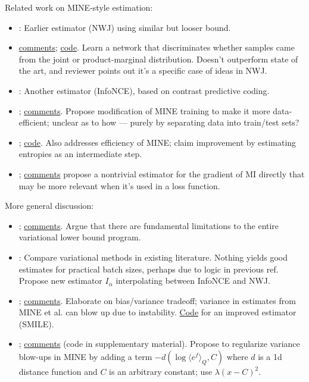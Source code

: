 \documentclass[notitlepage,openany,11pt]{report}
\theoremstyle{plain}%
\numberwithin{equation}{section}
\begin{document}
Related work on MINE-style estimation:
\begin{itemize}
\item \cite{NguyenEtAl:10}: Earlier estimator (NWJ) using similar but looser bound.
\item \cite{LiaoEtAl:20} \href{https://openreview.net/forum?id=3LujMJM9EMp}{comments}; \href{https://github.com/RayRuizhiLiao/demi_mi_estimator}{code}. Learn a network that discriminates whether samples came from the joint or product-marginal distribution. Doesn't outperform state of the art, and reviewer points out it's a specific case of ideas in NWJ.
\item \cite{OordEtAl:19}: Another estimator (InfoNCE), based on contrast predictive coding.
\item \cite{LinEtAl:19}; \href{https://openreview.net/forum?id=SklOypVKvS}{comments}. Propose modification of MINE training to make it more data-efficient; unclear as to how --- purely by separating data into train/test sets?
\item \cite{ChanEtAl:19}; \href{https://github.com/ccha23/MI-NEE}{code}. Also addresses efficiency of MINE; claim improvement by estimating entropies as an intermediate step.
\item \cite{WenEtAl:20}; \href{https://openreview.net/forum?id=ByxaUgrFvH}{comments} propose a nontrivial estimator for the gradient of MI directly that may be more relevant when it's used in a loss function.
\end{itemize}

More general discussion:
\begin{itemize}
\item \cite{McAllesterStratos:20}; \href{https://openreview.net/forum?id=BkedwoC5t7}{comments}. Argue that there are fundamental limitations to the entire variational lower bound program. 
\item \cite{PooleOzair:19}: Compare variational methods in existing literature. Nothing yields good estimates for practical batch sizes, perhaps due to logic in previous ref. Propose new estimator $I_{\alpha}$ interpolating between InfoNCE and NWJ.
\item \cite{SongErmon:20}; \href{https://openreview.net/forum?id=B1x62TNtDS}{comments}. Elaborate on bias/variance tradeoff; variance in estimates from MINE et al. can blow up due to instability. \href{https://github.com/ermongroup/smile-mi-estimator}{Code} for an improved estimator (SMILE).
\item \cite{ChoiLee:20}; \href{https://openreview.net/forum?id=Lvb2BKqL49a}{comments} (code in supplementary material). Propose to  regularize variance blow-ups in MINE by adding a term $- d( \log \langle e^f \rangle_{Q}, C)$ where $d$ is a 1d distance function and $C$ is an arbitrary constant; use $\lambda (x-C)^{2}$.
\end{itemize}
\end{document}
